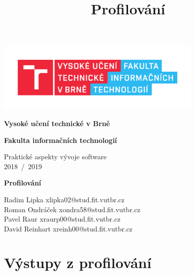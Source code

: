 \documentclass[11pt,a4paper,titlepage]{article}
\title{Profilování}
\begin{document}
	\begin{titlepage}
		\begin{center}
			\includegraphics[height = 96pt]{img/FIT_barevne_CMYK_CZ.pdf} \\

			\begin{LARGE}
				\textbf{Vysoké učení technické v Brně} \\
			\end{LARGE}

			\begin{Large}
				\textbf{Fakulta informačních technologií} \\
			\end{Large}

			\begin{large}
				Praktické aspekty vývoje software \\
				2018~/~2019
			\end{large}


			\begin{huge}
				\textbf{Profilování} \\
			\end{huge}


			\begin{large}
				Radim Lipka xlipka02@stud.fit.vutbr.cz \\
				Roman Ondráček xondra58@stud.fit.vutbr.cz \\
				Pavel Raur xraurp00@stud.fit.vutbr.cz \\
				David Reinhart xreinh00@stud.fit.vutbr.cz \\
			\end{large}
		\end{center}
	\end{titlepage}

	\newpage

	\section{Výstupy z profilování}
\end{document}
